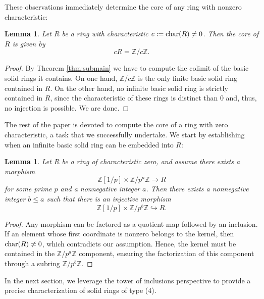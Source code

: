 \documentclass{amsart}
\newtheorem{lemma}[subsection]{Lemma}
\newcommand{\chara}{{\textup{char}}}
\newcommand{\Z}{{\mathbb Z}}
\begin{document}
    These observations immediately determine the core of any ring with nonzero characteristic:
    \begin{lemma}
    \label{lem:char_not0_core}
        Let $R$ be a ring with characteristic $c := \chara(R) \not= 0$.
        Then the core of $R$ is given by  
        $$
        cR = \Z/c\Z.
        $$
    \end{lemma}
    \begin{proof}
    	By Theorem \ref{thm:submain} we have to compute the colimit of the basic solid rings it contains.
    	On one hand, $\Z/c\Z$ is the only finite basic solid ring contained in $R$.
    	On the other hand, no infinite basic solid ring is strictly contained in $R$, since the characteristic of these rings is distinct than $0$ and, thus, no injection is possible.
    	We are done.
    \end{proof}

    The rest of the paper is devoted to compute the core of a ring with zero characteristic, a task that we successfully undertake.
    We start by establishing when an infinite basic solid ring can be embedded into $R$:

    \begin{lemma}
    \label{lm:char0_core}
    Let $R$ be a ring of characteristic zero, and assume there exists a morphism
    $$
    \Z[1/p] \times \Z/p^a\Z \to R
    $$
    for some prime $p$ and a nonnegative integer $a$.
    Then there exists a nonnegative integer $b \leq a$ such that there is an injective morphism
    $$
    \Z[1/p] \times \Z/p^b\Z \hookrightarrow R.
    $$
    \end{lemma}
    \begin{proof}
    Any morphism can be factored as a quotient map followed by an inclusion.
    If an element whose first coordinate is nonzero belongs to the kernel, then $\chara(R) \not= 0$, which contradicts our assumption.
    Hence, the kernel must be contained in the $\Z/p^a\Z$ component, ensuring the factorization of this component through a subring $\Z/p^b\Z$.
    \end{proof}

    In the next section, we leverage the tower of inclusions perspective to provide a precise characterization of solid rings of type (4).
    
\end{document}
